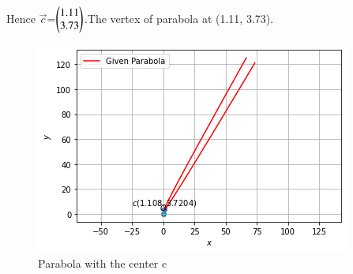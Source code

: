 \documentclass[journal,12pt,twocolumn]{IEEEtran}
\begin{document}
Hence $\vec{c}$=$\begin{pmatrix}1.11\\3.73\end{pmatrix}$.The vertex of parabola at (1.11, 3.73).
\renewcommand{\thefigure}{1}
\begin{figure}[!ht]
    \centering
    \includegraphics[width=\columnwidth]{parabola.png}
    \caption{Parabola with the center c}
    \label{Fig:1}
\end{figure}
\end{document}

